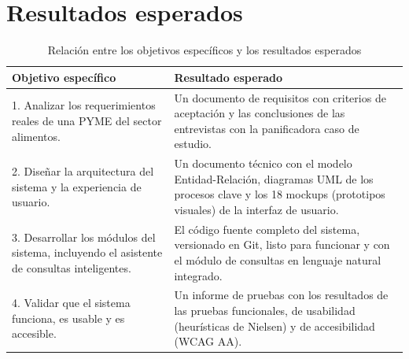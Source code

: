 
\section{Resultados esperados}

\begin{table}[H]
	\centering
	\label{tabla:resultadosEsperados}
	\caption{Relación entre los objetivos específicos y los resultados esperados}
	\begin{tabular}{|p{5.5cm}|p{7.5cm}|}
		\hline
			\cellcolor[gray]{0.9} \textbf{Objetivo específico} & \cellcolor[gray]{0.9}\textbf{Resultado esperado} \\
		\hline
		
1. Analizar los requerimientos reales de una PYME del sector alimentos.

 & 
Un documento de requisitos con criterios de aceptación y las conclusiones de las entrevistas con la panificadora caso de estudio.

\\
		\hline
		
2. Diseñar la arquitectura del sistema y la experiencia de usuario.

 & 
Un documento técnico con el modelo Entidad-Relación, diagramas UML de los procesos clave y los 18 mockups (prototipos visuales) de la interfaz de usuario.

\\
		\hline
	    
3. Desarrollar los módulos del sistema, incluyendo el asistente de consultas inteligentes.

& 
El código fuente completo del sistema, versionado en Git, listo para funcionar y con el módulo de consultas en lenguaje natural integrado.

        \\
        \hline
		
4. Validar que el sistema funciona, es usable y es accesible.

 & 
Un informe de pruebas con los resultados de las pruebas funcionales, de usabilidad (heurísticas de Nielsen) y de accesibilidad (WCAG AA).

\\
        
        \hline
	\end{tabular}
\end{table}
